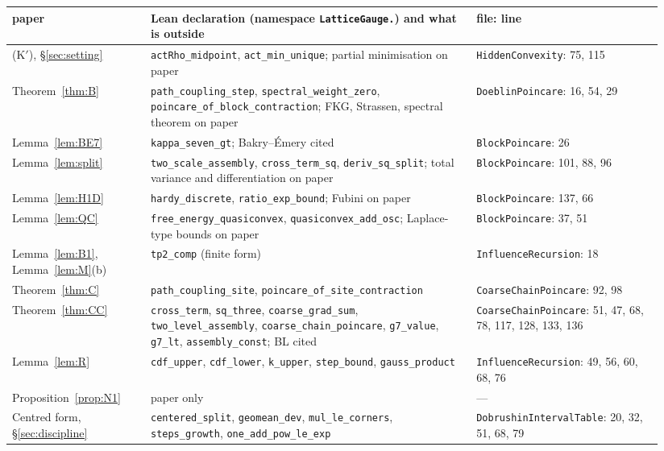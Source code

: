 \documentclass[11pt,a4paper]{article}
\theoremstyle{definition}
\theoremstyle{remark}
\newcommand{\code}[1]{\texttt{#1}}
\begin{document}
\begin{center}\footnotesize
\begin{tabular}{@{}p{0.20\linewidth}p{0.47\linewidth}p{0.27\linewidth}@{}}
\toprule
paper & Lean declaration (namespace \code{LatticeGauge.}) and what is outside & file: line\\
\midrule
(K$'$), \S\ref{sec:setting} & \code{actRho\_midpoint}, \code{act\_min\_unique}; partial minimisation on paper & \code{HiddenConvexity}: 75, 115\\
Theorem~\ref{thm:B} & \code{path\_coupling\_step}, \code{spectral\_weight\_zero}, \code{poincare\_of\_block\_contraction}; FKG, Strassen, spectral theorem on paper & \code{DoeblinPoincare}: 16, 54, 29\\
Lemma~\ref{lem:BE7} & \code{kappa\_seven\_gt}; Bakry--\'Emery cited & \code{BlockPoincare}: 26\\
Lemma~\ref{lem:split} & \code{two\_scale\_assembly}, \code{cross\_term\_sq}, \code{deriv\_sq\_split}; total variance and differentiation on paper & \code{BlockPoincare}: 101, 88, 96\\
Lemma~\ref{lem:H1D} & \code{hardy\_discrete}, \code{ratio\_exp\_bound}; Fubini on paper & \code{BlockPoincare}: 137, 66\\
Lemma~\ref{lem:QC} & \code{free\_energy\_quasiconvex}, \code{quasiconvex\_add\_osc}; Laplace-type bounds on paper & \code{BlockPoincare}: 37, 51\\
Lemma~\ref{lem:B1}, Lemma~\ref{lem:M}(b) & \code{tp2\_comp} (finite form) & \code{InfluenceRecursion}: 18\\
Theorem~\ref{thm:C} & \code{path\_coupling\_site}, \code{poincare\_of\_site\_contraction} & \code{CoarseChainPoincare}: 92, 98\\
Theorem~\ref{thm:CC} & \code{cross\_term}, \code{sq\_three}, \code{coarse\_grad\_sum}, \code{two\_level\_assembly}, \code{coarse\_chain\_poincare}, \code{g7\_value}, \code{g7\_lt}, \code{assembly\_const}; BL cited & \code{CoarseChainPoincare}: 51, 47, 68, 78, 117, 128, 133, 136\\
Lemma~\ref{lem:R} & \code{cdf\_upper}, \code{cdf\_lower}, \code{k\_upper}, \code{step\_bound}, \code{gauss\_product} & \code{InfluenceRecursion}: 49, 56, 60, 68, 76\\
Proposition~\ref{prop:N1} & paper only & ---\\
Centred form, \S\ref{sec:discipline} & \code{centered\_split}, \code{geomean\_dev}, \code{mul\_le\_corners}, \code{steps\_growth}, \code{one\_add\_pow\_le\_exp} & \code{DobrushinIntervalTable}: 20, 32, 51, 68, 79\\

\end{tabular}
\end{center}
\end{document}
